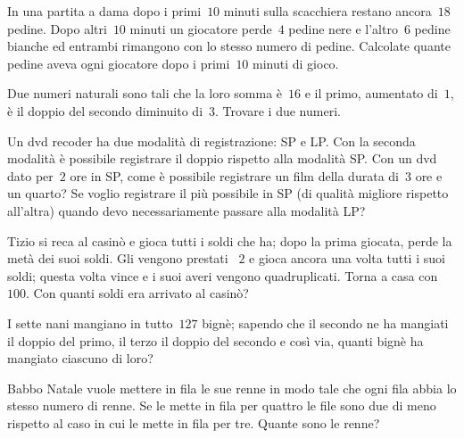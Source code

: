 \begin{multicols}{2}
\begin{esercizio}
\label{ese:16.52}
In una partita a dama dopo i primi~$10$ minuti sulla scacchiera restano ancora~$18$ pedine. Dopo altri~$10$ minuti un giocatore perde~$4$ pedine nere e l'altro~$6$ pedine bianche ed entrambi rimangono con lo stesso numero di pedine. Calcolate quante pedine aveva ogni giocatore dopo i primi~$10$ minuti di gioco.
\end{esercizio}

\begin{esercizio}[\Ast]
\label{ese:16.53}
Due numeri naturali sono tali che la loro somma è~$16$ e il primo, aumentato di~$1$, è il doppio del secondo diminuito di~$3$. Trovare i due numeri.
\end{esercizio}

\begin{esercizio}
\label{ese:16.54}
Un dvd recoder ha due modalità di registrazione: SP e LP. Con la seconda modalità è possibile registrare il doppio rispetto alla modalità SP. Con un dvd dato per~$2$ ore in SP, come è possibile registrare un film della durata di~$3$ ore e un quarto? Se voglio registrare il più possibile in SP (di qualità migliore rispetto all'altra) quando devo necessariamente passare alla modalità LP?
\end{esercizio}

\begin{esercizio}[\Ast]
\label{ese:16.55}
Tizio si reca al casinò e gioca tutti i soldi che ha; dopo la prima giocata, perde la metà dei suoi soldi. Gli vengono prestati \officialeuro~$2$ e gioca ancora una volta tutti i suoi soldi; questa volta vince e i suoi averi vengono quadruplicati. Torna a casa con \officialeuro~$100$. Con quanti soldi era arrivato al casinò?
\end{esercizio}

\begin{esercizio}[\Ast]
\label{ese:16.56}
I sette nani mangiano in tutto~$127$ bignè; sapendo che il secondo ne ha mangiati il doppio del primo, il terzo il doppio del secondo e così via, quanti bignè ha mangiato ciascuno di loro?
\end{esercizio}

\begin{esercizio}[\Ast]
\label{ese:16.57}
Babbo Natale vuole mettere in fila le sue renne in modo tale che ogni fila abbia lo stesso numero di renne. Se le mette in fila per quattro le file sono due di meno rispetto al caso in cui le mette in fila per tre. Quante sono le renne?
\end{esercizio}


\end{multicols}
